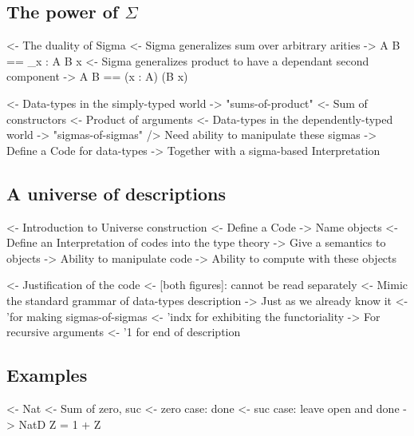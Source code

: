 \documentclass{article}
\newenvironment{structure}{\footnotesize\verbatim}{\endverbatim}
\begin{document}
\subsection{The power of $\Sigma$}

\begin{structure}
<- The duality of Sigma
    <- Sigma generalizes sum over arbitrary arities
        -> \Sigma A B == \Sigma_{x : A} B x
    <- Sigma generalizes product to have a dependant second component
        -> \Sigma A B == (x : A) \times (B x)
\end{structure}

\begin{structure}
<- Data-types in the simply-typed world
    -> "sums-of-product"
        <- Sum of constructors
        <- Product of arguments
<- Data-types in the dependently-typed world
    -> "sigmas-of-sigmas"
    /> Need ability to manipulate these sigmas
        -> Define a Code for data-types
        -> Together with a sigma-based Interpretation
\end{structure}

\subsection{A universe of descriptions}

\begin{structure}
<- Introduction to Universe construction
    <- Define a Code
        -> Name objects
    <- Define an Interpretation of codes into the type theory
        -> Give a semantics to objects
    -> Ability to manipulate code
    -> Ability to compute with these objects
\end{structure}

\begin{structure}
<- Justification of the code 
    <- [both figures]: cannot be read separately
    <- Mimic the standard grammar of data-types description
        -> Just as we already know it
        <- '\Sigma for making sigmas-of-sigmas
        <- 'indx for exhibiting the functoriality
            -> For recursive arguments
        <- '1 for end of description
\end{structure}

\subsection{Examples}

\begin{structure}
<- Nat
    <- Sum of zero, suc
    <- zero case: done
    <- suc case: leave open and done
    -> NatD Z = 1 + Z
\end{structure}
\end{document}
